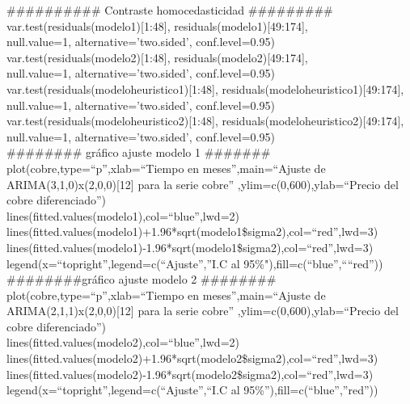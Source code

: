 \documentclass{report}
\begin{document}
\#\#\#\#\#\#\#\#\#\# Contraste homocedasticidad \#\#\#\#\#\#\#\#\# \\
var.test(residuals(modelo1)[1:48], residuals(modelo1)[49:174], \\
         null.value=1, alternative='two.sided',
         conf.level=0.95)\\
var.test(residuals(modelo2)[1:48], residuals(modelo2)[49:174], \\
         null.value=1, alternative='two.sided',
         conf.level=0.95)\\
var.test(residuals(modeloheuristico1)[1:48], residuals(modeloheuristico1)[49:174],\\ 
         null.value=1, alternative='two.sided',
         conf.level=0.95)\\
var.test(residuals(modeloheuristico2)[1:48], residuals(modeloheuristico2)[49:174], \\
         null.value=1, alternative='two.sided',
         conf.level=0.95)\\
         
\#\#\#\#\#\#\#\#  gráfico ajuste modelo 1 \#\#\#\#\#\#\# \\
plot(cobre,type=``p'',xlab=``Tiempo en meses'',main=``Ajuste de ARIMA(3,1,0)x(2,0,0)[12] para la serie cobre''
     ,ylim=c(0,600),ylab=``Precio del cobre diferenciado'')\\
lines(fitted.values(modelo1),col=``blue'',lwd=2)\\
lines(fitted.values(modelo1)+1.96*sqrt(modelo1\$sigma2),col=``red'',lwd=3)\\
lines(fitted.values(modelo1)-1.96*sqrt(modelo1\$sigma2),col=``red'',lwd=3)\\
legend(x=``topright'',legend=c(``Ajuste'',''I.C al 95\%"),fill=c(``blue'',````red''))\\

\#\#\#\#\#\#\#\#gráfico ajuste modelo 2 \#\#\#\#\#\#\#\# \\
plot(cobre,type=``p'',xlab=``Tiempo en meses'',main=``Ajuste de ARIMA(2,1,1)x(2,0,0)[12] para la serie cobre''
     ,ylim=c(0,600),ylab=``Precio del cobre diferenciado'')\\
lines(fitted.values(modelo2),col=``blue'',lwd=2)\\
lines(fitted.values(modelo2)+1.96*sqrt(modelo2\$sigma2),col=``red'',lwd=3)\\
lines(fitted.values(modelo2)-1.96*sqrt(modelo2\$sigma2),col=``red'',lwd=3)\\
legend(x=``topright'',legend=c(``Ajuste'',``I.C al 95\%''),fill=c(``blue'',''red''))\\
\end{document}
